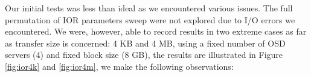 Our initial tests was less than ideal as we encountered various issues.  The
full permutation of IOR parameters sweep were not explored due to I/O errors
we encountered.  We were, however, able to record results in two extreme cases
as far as transfer size is concerned: 4 KB and 4 MB, using a fixed number of
OSD servers (4) and fixed block size (8 GB), the results are illustrated in
Figure \ref{fig:ior4k} and \ref{fig:ior4m}, we make the following
observations:


